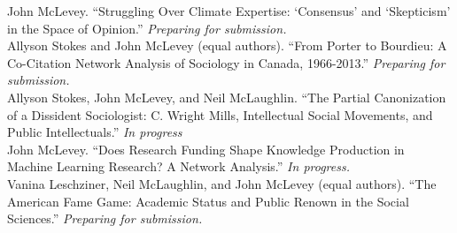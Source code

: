 \documentclass[11pt,usenames,dvipsnames]{article}
\begin{document}



\ind John McLevey. ``Struggling Over Climate Expertise: `Consensus' and `Skepticism' in the Space of Opinion.'' \emph{Preparing for submission.}  \\ %

\ind Allyson Stokes and John McLevey (equal authors). ``From Porter to Bourdieu: A Co-Citation Network Analysis of Sociology in Canada, 1966-2013.'' \emph{Preparing for submission.} \\

\ind Allyson Stokes, John McLevey, and Neil McLaughlin. ``The Partial Canonization of a Dissident Sociologist: C. Wright Mills, Intellectual Social Movements, and Public Intellectuals.'' \emph{In progress} \\ %

\ind John McLevey. ``Does Research Funding Shape Knowledge Production in Machine Learning Research? A Network Analysis.'' \emph{In progress.} \\ 

\ind Vanina Leschziner, Neil McLaughlin, and John McLevey (equal authors). ``The American Fame Game: Academic Status and Public Renown in the Social Sciences.'' \emph{Preparing for submission.} \\ %



\end{document}
